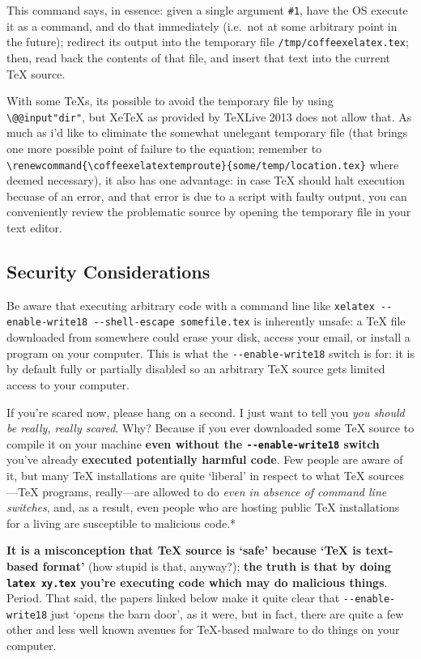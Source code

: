 This command says, in essence: given a single argument \texttt{\#1},
have the OS execute it as a command, and do that immediately (i.e.~not
at some arbitrary point in the future); redirect its output into the
temporary file \texttt{/tmp/coffeexelatex.tex}; then, read back the
contents of that file, and insert that text into the current TeX source.

With some TeXs, its possible to avoid the temporary file by using
\texttt{\textbackslash{}@@input\textbar{}"dir"}, but XeTeX as provided
by TeXLive 2013 does not allow that. As much as i'd like to eliminate
the somewhat unelegant temporary file (that brings one more possible
point of failure to the equation; remember to
\texttt{\textbackslash{}renewcommand\{\textbackslash{}coffeexelatextemproute\}\{some/temp/location.tex\}}
where deemed necessary), it also has one advantage: in case TeX should
halt execution becuase of an error, and that error is due to a script
with faulty output, you can conveniently review the problematic source
by opening the temporary file in your text editor.

\subsection{Security Considerations}\label{security-considerations}

Be aware that executing arbitrary code with a command line like
\texttt{xelatex -{}-enable-write18 -{}-shell-escape somefile.tex} is
inherently unsafe: a TeX file downloaded from somewhere could erase your
disk, access your email, or install a program on your computer. This is
what the \texttt{-{}-enable-write18} switch is for: it is by default
fully or partially disabled so an arbitrary TeX source gets limited
access to your computer.

If you're scared now, please hang on a second. I just want to tell you
\emph{you should be really, really scared}. Why? Because if you ever
downloaded some TeX source to compile it on your machine \textbf{even
without the \texttt{-{}-enable-write18} switch} you've already
\textbf{executed potentially harmful code}. Few people are aware of it,
but many TeX installations are quite `liberal' in respect to what TeX
sources---TeX programs, really---are allowed to do \emph{even in absence
of command line switches}, and, as a result, even people who are hosting
public TeX installations for a living are susceptible to malicious
code.*

\textbf{It is a misconception that TeX source is `safe' because `TeX is
text-based format'} (how stupid is that, anyway?); \textbf{the truth is
that by doing \texttt{latex xy.tex} you're executing code which may do
malicious things}. Period. That said, the papers linked below make it
quite clear that \texttt{-{}-enable-write18} just `opens the barn door',
as it were, but in fact, there are quite a few other and less well known
avenues for TeX-based malware to do things on your computer.


